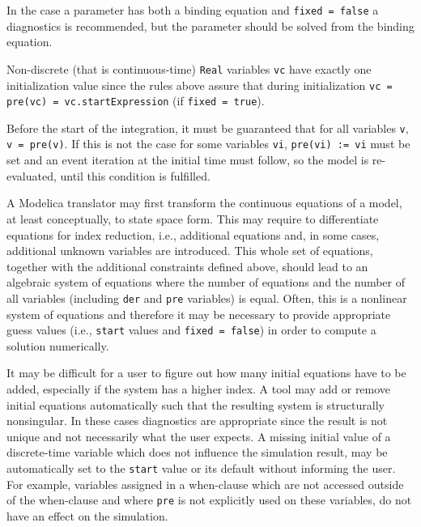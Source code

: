\begin{nonnormative}
In the case a parameter has both a binding equation and \lstinline!fixed = false! a diagnostics is recommended, but the parameter should be solved from the binding equation.

Non-discrete (that is continuous-time) \lstinline!Real! variables \lstinline!vc! have exactly one initialization value since the rules above assure that during initialization
\lstinline!vc = pre(vc) = vc.startExpression! (if \lstinline!fixed = true!).

Before the start of the integration, it must be guaranteed that for all variables \lstinline!v!, \lstinline!v = pre(v)!. If this is not the case for some variables
\lstinline!vi!, \lstinline!pre(vi) := vi! must be set and an event iteration at the initial time must follow, so the model is re-evaluated, until this condition is fulfilled.

A Modelica translator may first transform the continuous equations of a model, at least conceptually, to state space form.  This may require to differentiate equations for index
reduction, i.e., additional equations and, in some cases, additional unknown variables are introduced.  This whole set of equations, together with the additional constraints
defined above, should lead to an algebraic system of equations where the number of equations and the number of all variables (including \lstinline!der! and \lstinline!pre!
variables) is equal.  Often, this is a nonlinear system of equations and therefore it may be necessary to provide appropriate guess values (i.e., \lstinline!start! values and
\lstinline!fixed = false!) in order to compute a solution numerically.

It may be difficult for a user to figure out how many initial equations have to be added, especially if the system has a higher index. A tool may add or remove initial equations
automatically such that the resulting system is structurally nonsingular.  In these cases diagnostics are appropriate since the result is not unique and not necessarily what the user
expects.  A missing initial value of a discrete-time variable which does not influence the simulation result, may be automatically set to the \lstinline!start! value or its default without
informing the user.  For example, variables assigned in a when-clause which are not accessed outside of the when-clause and where \lstinline!pre! is not explicitly
used on these variables, do not have an effect on the simulation.
\end{nonnormative}

